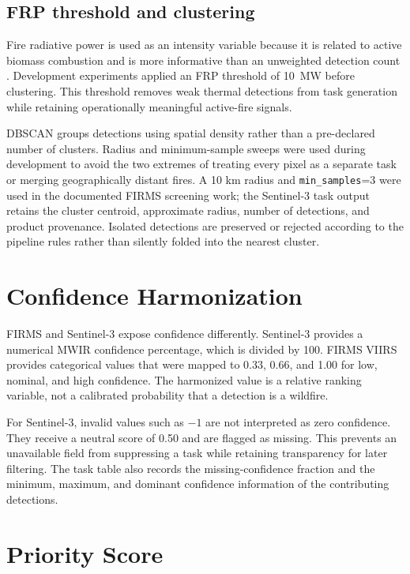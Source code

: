 \subsection{FRP threshold and clustering}

Fire radiative power is used as an intensity variable because it is related to active biomass combustion and is more informative than an unweighted detection count \citep{Wooster2012}. Development experiments applied an FRP threshold of \SI{10}{\mega\watt} before clustering. This threshold removes weak thermal detections from task generation while retaining operationally meaningful active-fire signals.

DBSCAN groups detections using spatial density rather than a pre-declared number of clusters. Radius and minimum-sample sweeps were used during development to avoid the two extremes of treating every pixel as a separate task or merging geographically distant fires. A 10 km radius and \texttt{min\_samples}=3 were used in the documented FIRMS screening work; the Sentinel-3 task output retains the cluster centroid, approximate radius, number of detections, and product provenance. Isolated detections are preserved or rejected according to the pipeline rules rather than silently folded into the nearest cluster.

\section{Confidence Harmonization}

FIRMS and Sentinel-3 expose confidence differently. Sentinel-3 provides a numerical MWIR confidence percentage, which is divided by 100. FIRMS VIIRS provides categorical values that were mapped to 0.33, 0.66, and 1.00 for low, nominal, and high confidence. The harmonized value is a relative ranking variable, not a calibrated probability that a detection is a wildfire.

For Sentinel-3, invalid values such as $-1$ are not interpreted as zero confidence. They receive a neutral score of 0.50 and are flagged as missing. This prevents an unavailable field from suppressing a task while retaining transparency for later filtering. The task table also records the missing-confidence fraction and the minimum, maximum, and dominant confidence information of the contributing detections.

\section{Priority Score}

